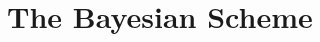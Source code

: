 \documentclass{beamer}
\begin{document}
\begin{frame}[allowframebreaks]
\begin{itemize}

  \end{itemize}
\end{frame}

\section{The Bayesian Scheme}








\end{document}
